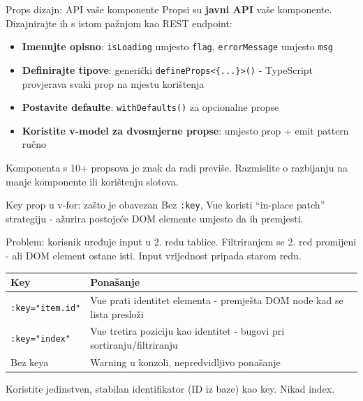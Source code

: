 \begin{frame}{Props dizajn: API vaše komponente}
Propsi su \textbf{javni API} vaše komponente. Dizajnirajte ih s istom pažnjom kao REST endpoint:

\vspace{0.4em}
\begin{itemize}
  \item \textbf{Imenujte opisno}: \texttt{isLoading} umjesto \texttt{flag}, \texttt{errorMessage} umjesto \texttt{msg}
  \item \textbf{Definirajte tipove}: generički \texttt{defineProps<\{...\}>()} - TypeScript provjerava svaki prop na mjestu korištenja
  \item \textbf{Postavite defaulte}: \texttt{withDefaults()} za opcionalne propse
  \item \textbf{Koristite v-model za dvosmjerne propse}: umjesto prop + emit pattern ručno
\end{itemize}

\vspace{0.6em}
Komponenta s 10+ propsova je znak da radi previše. Razmislite o razbijanju na manje komponente ili korištenju slotova.
\end{frame}

\begin{frame}{Key prop u v-for: zašto je obavezan}
Bez \texttt{:key}, Vue koristi \enquote{in-place patch} strategiju - ažurira postojeće DOM elemente umjesto da ih premjesti.

\vspace{0.4em}
Problem: korisnik uređuje input u 2. redu tablice. Filtriranjem se 2. red promijeni - ali DOM element ostane isti. Input vrijednost pripada starom redu.

\vspace{0.6em}
\begin{tabular}{@{}lp{8cm}@{}}
  \toprule
  \textbf{Key} & \textbf{Ponašanje} \\
  \midrule
  \texttt{:key="item.id"} & Vue prati identitet elementa - premješta DOM node kad se lista presloži \\
  \texttt{:key="index"} & Vue tretira poziciju kao identitet - bugovi pri sortiranju/filtriranju \\
  Bez keya & Warning u konzoli, nepredvidljivo ponašanje \\
  \bottomrule
\end{tabular}

\vspace{0.4em}
Koristite jedinstven, stabilan identifikator (ID iz baze) kao key. Nikad index.
\end{frame}

